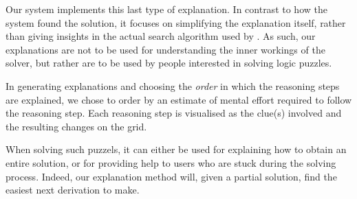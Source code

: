Our system implements this last type of explanation. In contrast to how the system found the solution, it focuses on simplifying the explanation itself, rather than giving insights in the actual search algorithm used by \idp. As such, our explanations are not to be used for understanding the inner workings of the solver, but rather are to be used by people interested in solving logic puzzles.

In generating explanations and choosing the \textit{order} in which the reasoning steps are explained, we chose to order by an estimate of mental effort required to follow the reasoning step. Each reasoning step is visualised as the clue(s) involved and the resulting changes on the grid.

When solving such puzzels, it can either be used for explaining how to obtain an entire solution, or for providing help to users who are stuck during the solving process. Indeed, our explanation method will, given a partial solution, find the easiest next derivation to make. 

